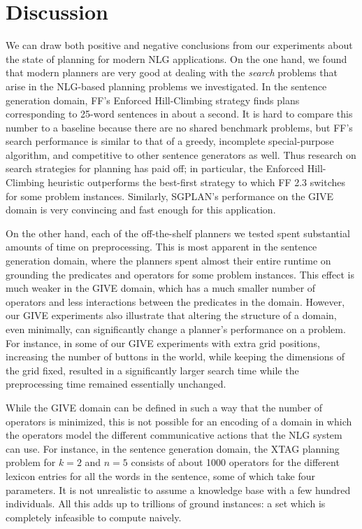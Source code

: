 \section{Discussion}
\label{sec:discussion}

We can draw both positive and negative conclusions from our
experiments about the state of planning for modern NLG
applications. On the one hand, we found that modern planners are very
good at dealing with the \emph{search} problems that arise in the
NLG-based planning problems we investigated.
In the sentence generation domain, FF's Enforced
Hill-Climbing strategy finds plans corresponding to 25-word sentences
in about a second. It is hard to compare this number to a baseline
because there are no shared benchmark problems, but FF's search
performance is similar to that of a greedy, incomplete special-purpose
algorithm, and competitive to other sentence generators as well. Thus
research on search strategies for planning has paid off; in
particular, the Enforced Hill-Climbing heuristic outperforms the
best-first strategy to which FF 2.3 switches for some problem
instances. Similarly, SGPLAN's performance on the GIVE domain is very
convincing and fast enough for this application.

On the other hand, each of the off-the-shelf planners we tested spent
substantial amounts of time on preprocessing. This is most apparent in the
sentence generation domain, where the planners spent almost their entire
runtime on grounding the predicates and operators for some problem instances.
This effect is much weaker in the GIVE domain, which has a much smaller
number of operators and less interactions between the predicates in the
domain. However, our GIVE experiments also illustrate that altering the
structure of a domain, even minimally, can significantly change a planner's
performance on a problem. For instance, in some of our GIVE experiments with
extra grid positions, increasing the number of buttons in the world, while
keeping the dimensions of the grid fixed, resulted in a significantly larger
search time while the preprocessing time remained essentially unchanged.

While the GIVE domain can be defined in such a way that the number of
operators is minimized, this is not possible for an encoding of a domain in
which the operators model the different communicative actions that the NLG
system can use. For instance, in the sentence generation domain, the XTAG
planning problem for $k=2$ and $n=5$ consists of about 1000 operators for the
different lexicon entries for all the words in the sentence, some of which
take four parameters. It is not unrealistic to assume a knowledge base with a
few hundred individuals. All this adds up to trillions of ground
instances: a set which is completely infeasible to compute naively.

